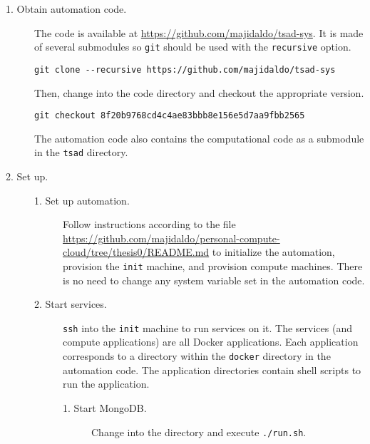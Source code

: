\begin{description}



\item[1. Obtain automation code.] \hfill

  The code is available at \url{https://github.com/majidaldo/tsad-sys}.
  It is made of several submodules so \texttt{git} should be used with the \texttt{recursive} option.%
  
\begin{verbatim}
git clone --recursive https://github.com/majidaldo/tsad-sys
\end{verbatim}
  Then, change into the code directory and checkout the appropriate version.
  

\begin{verbatim}
git checkout 8f20b9768cd4c4ae83bbb8e156e5d7aa9fbb2565
\end{verbatim}

  The automation code also contains the computational code as a submodule in the \texttt{tsad} directory.


\item[2. Set up.] \hfill

\begin{description}

\item[1. Set up automation.] \hfill

  Follow instructions according to the  file \url{https://github.com/majidaldo/personal-compute-cloud/tree/thesis0/README.md} to initialize the automation, provision the \texttt{init} machine, and provision compute machines.
  There is no need to change any system variable set in the automation code.


\item[2. Start services.] \hfill

  \texttt{ssh} into the \texttt{init} machine to run services on it.
  The services (and compute applications) are all \textsf{Docker} applications.
  Each application corresponds to a directory within the \texttt{docker} directory in the automation code.
  The application directories contain shell scripts to run the application.

  \begin{description}

  \item[1. Start \textsf{MongoDB}.] \hfill

    Change into the  directory and execute \texttt{./run.sh}.


\end{description}
\end{description}
\end{description}
